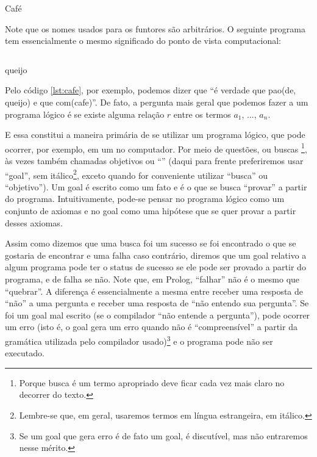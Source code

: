 \begin{listing}
  \inputminted{prolog}{../Exemplos/Cap0/prog1_cafe.pl}
  \caption{Café}\label{lst:cafe}
\end{listing}

Note que os nomes usados para os funtores são arbitrários. O seguinte
programa tem essencialmente o mesmo significado do ponto de vista
computacional:\\

%
\begin{listing}
  \inputminted{prolog}{../Exemplos/Cap0/prog2_queijo.pl}
  \caption{queijo}\label{lst:queijo}
\end{listing}

Pelo código \ref{lst:cafe}, por exemplo, podemos dizer que ``é verdade
que pao(de, queijo) e que com(cafe)''. De fato, a pergunta mais geral
que podemos fazer a um programa lógico é se existe alguma relação $r$
entre os termos $a_1$, ..., $a_n$.

E essa constitui a maneira primária de se utilizar um programa lógico,
que pode ocorrer, por exemplo, em um  no
computador. Por meio de questões, ou buscas \footnote{Porque busca é
um termo apropriado deve ficar cada vez mais claro no decorrer do
texto.}, às vezes também chamadas objetivos ou ``''
(daqui para frente preferiremos usar ``goal'', sem
itálico\footnote{Lembre-se que, em geral, usaremos termos em língua
  estrangeira, em itálico.}, exceto quando for conveniente utilizar
``busca'' ou ``objetivo''). Um goal é escrito como um fato e é o que
se busca ``provar'' a partir do programa. Intuitivamente, pode-se
pensar no programa lógico como um conjunto de axiomas e no goal como
uma hipótese que se quer provar a partir desses axiomas. 

Assim como dizemos que uma busca foi um sucesso se foi encontrado o
que se gostaria de encontrar e uma falha caso contrário, diremos que
um goal relativo a algum programa pode ter o status de sucesso se ele
pode ser provado a partir do programa, e de falha se não. Note que, em
Prolog, ``falhar'' não é o mesmo que ``quebrar''. A diferença é
essencialmente a mesma entre receber uma resposta de ``não'' a uma
pergunta e receber uma resposta de ``não entendo sua pergunta''.  Se
foi um goal mal escrito (se o compilador ``não entende a pergunta''),
pode ocorrer um erro (isto é, o goal gera um erro quando não é
``compreensível'' a partir da gramática utilizada pelo compilador
usado)\footnote{Se um goal que gera erro é de fato um goal, é
discutível, mas não entraremos nesse mérito.} e o programa pode não
ser executado.

